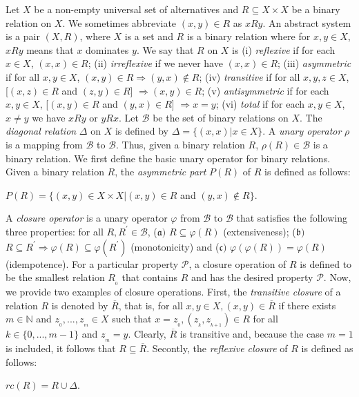 \documentclass{article}
\theoremstyle{definition}
\begin{document}
Let $X$ be a non-empty universal set of alternatives and
$R\subseteq X\times X$ be a binary relation on $X$.
We sometimes
abbreviate $(x,y)\in R$ as $xRy$. 
An abstract system \cite{VM} is a pair $(X, R)$, where $X$ is a set and $R$ is a binary
relation where for $x, y\in X$, $xRy$ means that $x$ dominates $y$.
We say that $R$ on $X$ is (i) {\it reflexive} if for each $x\in X$, $(x,x)\in R$; (ii)
{\it irreflexive} if we never have $(x,x)\in R$;
(iii) {\it asymmetric} if for all $x, y\in X$, $(x,y)\in R \Rightarrow (y,x)\notin R$;
(iv) {\it transitive} if for all $x,y,z\in X$, [$(x,z)\in R$ and
$(z,y)\in R$] $\Rightarrow (x,y)\in R$; 
(v)
{\it antisymmetric} if for each $x,y\in X$,
[$(x,y)\in R$ and
$(y,x)\in R$] $\Rightarrow x=y$; 
(vi) {\it total} if for each $x,y\in X$,
$x\neq y$ we have $xRy$ or $yRx$.
Let $\mathcal{B}$ be the set of binary relations on $X$.
The {\it diagonal relation} $\Delta$ on $X$ is defined by $\Delta=\{(x,x)\vert x\in X\}$. 
A {\it unary operator} $\rho$ is a mapping from $\mathcal{B}$ to $\mathcal{B}$.
Thus, given a binary relation $R$, $\rho(R)\in \mathcal{B}$  is a binary relation. 
We first define the basic unary operator for binary relations. 
Given a binary relation $R$, the {\it asymmetric part} $P(R)$ of $R$ is defined as follows:
\begin{center}
$P(R)=\{(x,y)\in X\times X\vert (x,y)\in R$ and $(y,x)\notin R\}$.
\end{center}
A {\it closure operator} is a unary operator $\varphi$ from $\mathcal{B}$ to $\mathcal{B}$ that satisfies the following three properties: for all $R, R^{\prime}\in \mathcal{B}$,
($\mathfrak{a})$ $R\subseteq \varphi(R)$ (extensiveness); ($\mathfrak{b})$ 
$R\subseteq R^{\prime}\Rightarrow \varphi(R)\subseteq \varphi(R^{\prime})$ (monotonicity) and
($\mathfrak{c})$
$\varphi(\varphi(R))=\varphi(R)$ (idempotence).
For a particular property $\mathcal{P}$, a closure operation
of $R$ is defined to be the smallest relation $R_{_0}$
that contains $R$ and has the
desired property $\mathcal{P}$.
Now, we provide two examples of closure operations. First, the 
{\it transitive closure} of a relation $R$
is denoted by $\overline{R}$, that is, for all 
$x, y\in X, (x,y)\in \overline{R}$ if there exists $m\in \mathbb{N}$ and $z_{_0},...,z_{_m}\in X$
such that $x=z_{_0}, (z_{_k},z_{_{k+1}})\in R$ for all $k\in \{0,...,m-1\}$ and $z_{_m}=y$. Clearly, 
$\overline{R}$ is transitive and, because the case $m=1$ is included, it follows that 
$R\subseteq \overline{R}$. 
Secontly, the {\it reflexive closure} of $R$ is defined as follows:
\begin{center}
$rc(R)=R\cup \Delta$.
\end{center}
\end{document}
